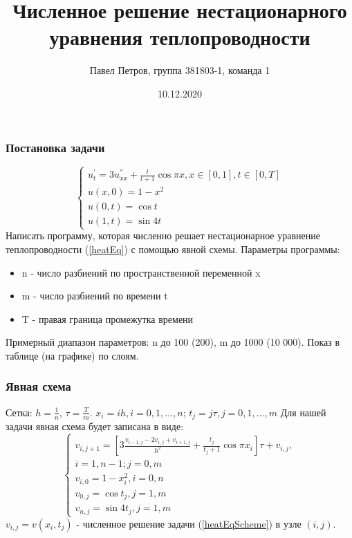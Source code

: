 \documentclass{beamer}
\title{Численное решение нестационарного уравнения теплопроводности}
\author{Павел Петров, группа 381803-1, команда 1}
\date{10.12.2020}
\begin{document}
	\begin{frame}
		\titlepage
	\end{frame}

	\begin{frame}
		\frametitle{Постановка задачи}

		\begin{equation}\label{heatEq}
			\begin{cases}
				u^{'}_{t} = 3 u^{''}_{xx} + \frac{t}{t+1} \cos{\pi x}, x \in [0,1] , t \in [0, T] \\
				u(x, 0) = 1 - x^2 \\
				u(0, t) = \cos{t} \\
				u(1, t) = \sin{4t}
			\end{cases}
		\end{equation}
	Написать программу, которая численно решает нестационарное уравнение теплопроводности (\ref{heatEq}) с помощью явной схемы. Параметры программы:
		\begin{itemize}
			\item n - число разбиений по пространственной переменной x
			\item m - число разбиений по времени t
			\item T - правая граница промежутка времени
		\end{itemize}
Примерный диапазон параметров: n до 100 (200), m до 1000 (10 000). Показ в таблице (на графике) по слоям.
	\end{frame}

	\begin{frame}
		\frametitle{Явная схема}
		Сетка: $h = \frac{1}{n}$, $\tau = \frac{T}{m}$. $x_{i} = ih, i = 0, 1, ..., n$; $t_{j} = j\tau, j = 0, 1, ..., m$
		\newline
		Для нашей задачи явная схема будет записана в виде:
		\begin{equation}\label{heatEqScheme}
			\begin{cases}
				v_{i,j+1} = [3\frac{v_{i-1,j}-2v_{i,j}+v_{i+1,j}}{h^2}  + \frac{t_{j}}{t_{j} + 1} \cos{\pi x_{i}}]\tau + v_{i,j},\\
				i = 1,n-1; j=0,m \\
				v_{i,0} = 1 - x^2_{i}, i =0,n \\
				v_{0,j} = \cos{t_{j}}, j = 1,m\\
				v_{n,j} = \sin{4t_{j}}, j = 1,m
			\end{cases}
		\end{equation}
	$v_{i,j} = v(x_{i},t_{j})$ - численное решение задачи (\ref{heatEqScheme}) в узле $(i,j)$.
	\end{frame}
\end{document}
